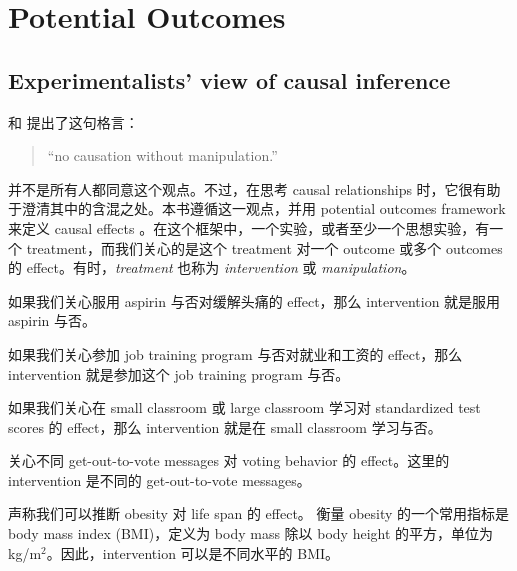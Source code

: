 \chapter{Potential Outcomes}
 \label{chapter::potential-outcomes}


\section{Experimentalists' view of causal inference}






\citet{rubin1975bayesian} 和 \citet{holland1986statistics} 提出了这句格言：
\begin{quote}
``no causation without manipulation.''
\end{quote}
并不是所有人都同意这个观点。不过，在思考 causal relationships 时，它很有助于澄清其中的含混之处。本书遵循这一观点，并用 potential outcomes framework 来定义 causal effects \citep{Neyman:1923, Rubin:1974}。在这个框架中，一个实验，或者至少一个思想实验，有一个 treatment，而我们关心的是这个 treatment 对一个 outcome 或多个 outcomes 的 effect。有时，{\it treatment} 也称为 {\it intervention} 或 {\it manipulation}。


\begin{example}\label{eg::aspirin}
如果我们关心服用 aspirin 与否对缓解头痛的 effect，那么 intervention 就是服用 aspirin 与否。
\end{example}



\begin{example}\label{eg::jobtraining}
如果我们关心参加 job training program 与否对就业和工资的 effect，那么 intervention 就是参加这个 job training program 与否。
\end{example}


\begin{example}\label{eg::classroom}
如果我们关心在 small classroom 或 large classroom 学习对 standardized test scores 的 effect，那么 intervention 就是在 small classroom 学习与否。
\end{example} 

\begin{example}\label{eg::gotv}
\citet{gerber2008social} 关心不同 get-out-to-vote messages 对 voting behavior 的 effect。这里的 intervention 是不同的 get-out-to-vote messages。
\end{example} 


\begin{example}\label{eg::bmi}
\citet{pearl2018does} 声称我们可以推断 obesity 对 life span 的 effect。
衡量 obesity 的一个常用指标是 body mass index (BMI)，定义为 body mass 除以 body height 的平方，单位为 kg/m$^2$。因此，intervention 可以是不同水平的 BMI。
\end{example} 


